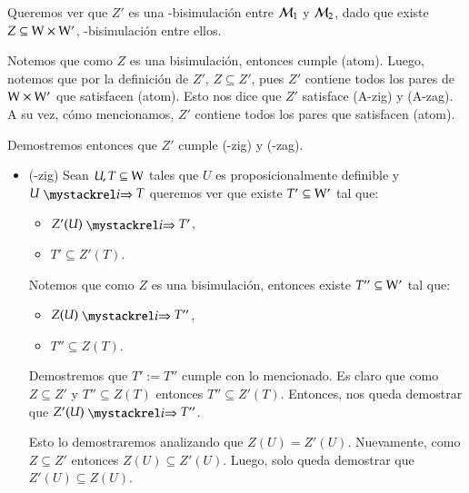 \begin{demostracion}
    Queremos ver que $Z'$ es una \KHilogic-bisimulación entre $\mathcal{M}_1$ y $\mathcal{M}_2$, dado que existe $Z \subseteq \mathrm{W} \times \mathrm{W}'$, \KHilogic-bisimulación entre ellos.

    Notemos que como $Z$ es una bisimulación, entonces cumple (atom). Luego, notemos que por la definición de $Z'$, $Z \subseteq Z'$, pues $Z'$ contiene todos los pares de $\mathrm{W} \times \mathrm{W}'$ que satisfacen (atom). Esto nos dice que $Z'$ satisface (A-zig) y (A-zag). A su vez, cómo mencionamos, $Z'$ contiene todos los pares que satisfacen (atom).

    Demostremos entonces que $Z'$ cumple (\KHilogic-zig) y (\KHilogic-zag).

    \begin{itemize}
        \item (\KHilogic-zig) Sean $U,T \subseteq \mathrm{W}$ tales que $U$ es proposicionalmente definible y $U \ultsExecAgi T$ queremos ver que existe $T' \subseteq \mathrm{W}'$ tal que:
    
        \begin{multicols}{2}
            \begin{itemize}
                \item $Z'(U) \ultsExecAgi T'$, 
                \item $T' \subseteq Z'(T)$.
            \end{itemize}
        \end{multicols}
    
        Notemos que como $Z$ es una bisimulación, entonces existe $T'' \subseteq \mathrm{W}'$ tal que:
    
        \begin{multicols}{2}
            \begin{itemize}
                \item $Z(U) \ultsExecAgi T''$, 
                \item $T'' \subseteq Z(T)$.
            \end{itemize}
        \end{multicols}
    
        Demostremos que $T' := T''$ cumple con lo mencionado. Es claro que como $Z \subseteq Z'$ y $T'' \subseteq Z(T)$ entonces $T'' \subseteq Z'(T)$. Entonces, nos queda demostrar que $Z'(U) \ultsExecAgi T''$.
    
        Esto lo demostraremos analizando que $Z(U) = Z'(U)$. Nuevamente, como $Z \subseteq Z'$ entonces $Z(U) \subseteq Z'(U)$. Luego, solo queda demostrar que $Z'(U) \subseteq Z(U)$.
    

\end{itemize}
\end{demostracion}

